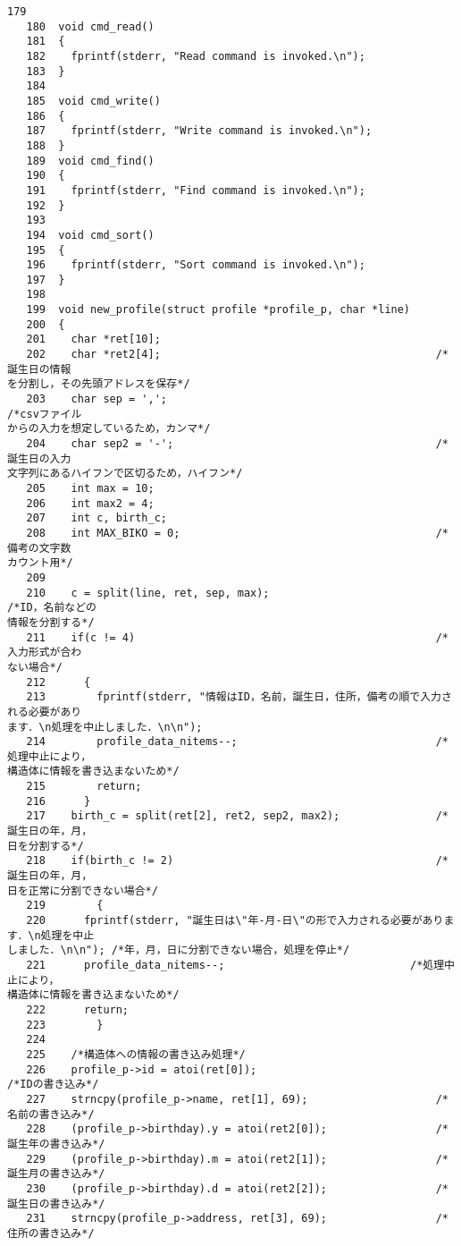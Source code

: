 \begin{Verbatim}[fontsize=\small, baselinestretch=0.8]
   179	
   180	void cmd_read()
   181	{
   182	  fprintf(stderr, "Read command is invoked.\n");
   183	}
   184	
   185	void cmd_write()
   186	{
   187	  fprintf(stderr, "Write command is invoked.\n");
   188	}
   189	void cmd_find()
   190	{
   191	  fprintf(stderr, "Find command is invoked.\n");
   192	}
   193	
   194	void cmd_sort()
   195	{
   196	  fprintf(stderr, "Sort command is invoked.\n");
   197	}
   198	
   199	void new_profile(struct profile *profile_p, char *line)
   200	{
   201	  char *ret[10];
   202	  char *ret2[4];                                           /*誕生日の情報
を分割し，その先頭アドレスを保存*/
   203	  char sep = ',';                                          /*csvファイル
からの入力を想定しているため，カンマ*/
   204	  char sep2 = '-';                                         /*誕生日の入力
文字列にあるハイフンで区切るため，ハイフン*/
   205	  int max = 10;
   206	  int max2 = 4;
   207	  int c, birth_c;
   208	  int MAX_BIKO = 0;                                        /*備考の文字数
カウント用*/
   209	  
   210	  c = split(line, ret, sep, max);                          /*ID，名前などの
情報を分割する*/
   211	  if(c != 4)                                               /*入力形式が合わ
ない場合*/
   212	    {
   213	      fprintf(stderr, "情報はID，名前，誕生日，住所，備考の順で入力される必要があり
ます．\n処理を中止しました．\n\n");
   214	      profile_data_nitems--;                               /*処理中止により，
構造体に情報を書き込まないため*/
   215	      return;
   216	    }
   217	  birth_c = split(ret[2], ret2, sep2, max2);               /*誕生日の年，月，
日を分割する*/
   218	  if(birth_c != 2)                                         /*誕生日の年，月，
日を正常に分割できない場合*/
   219	      {
   220		fprintf(stderr, "誕生日は\"年-月-日\"の形で入力される必要があります．\n処理を中止
しました．\n\n"); /*年，月，日に分割できない場合，処理を停止*/
   221		profile_data_nitems--;                             /*処理中止により，
構造体に情報を書き込まないため*/
   222		return;
   223	      }
   224	
   225	  /*構造体への情報の書き込み処理*/
   226	  profile_p->id = atoi(ret[0]);                            /*IDの書き込み*/
   227	  strncpy(profile_p->name, ret[1], 69);                    /*名前の書き込み*/
   228	  (profile_p->birthday).y = atoi(ret2[0]);                 /*誕生年の書き込み*/
   229	  (profile_p->birthday).m = atoi(ret2[1]);                 /*誕生月の書き込み*/
   230	  (profile_p->birthday).d = atoi(ret2[2]);                 /*誕生日の書き込み*/
   231	  strncpy(profile_p->address, ret[3], 69);                 /*住所の書き込み*/

\end{Verbatim}
